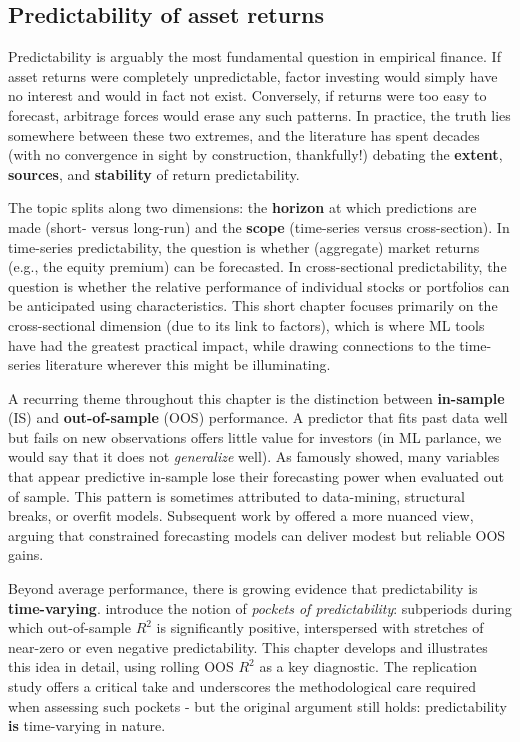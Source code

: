\subsection{Predictability of asset returns}

Predictability is arguably the most fundamental question in empirical finance. If asset returns were completely unpredictable, factor investing would simply have no interest and would in fact not exist. Conversely, if returns were too easy to forecast, arbitrage forces would erase any such patterns. In practice, the truth lies somewhere between these two extremes, and the literature has spent decades (with no convergence in sight by construction, thankfully!) debating the \textbf{extent}, \textbf{sources}, and \textbf{stability} of return predictability.

The topic splits along two dimensions: the \textbf{horizon} at which predictions are made (short- versus long-run) and the \textbf{scope} (time-series versus cross-section). In time-series predictability, the question is whether (aggregate) market returns (e.g., the equity premium) can be forecasted. In cross-sectional predictability, the question is whether the relative performance of individual stocks or portfolios can be anticipated using characteristics. This short chapter focuses primarily on the cross-sectional dimension (due to its link to factors), which is where ML tools have had the greatest practical impact, while drawing connections to the time-series literature wherever this might be illuminating.

A recurring theme throughout this chapter is the distinction between \textbf{in-sample} (IS) and \textbf{out-of-sample} (OOS) performance. A predictor that fits past data well but fails on new observations offers little value for investors (in ML parlance, we would say that it does not \textit{generalize} well). As \cite{goyal2008comprehensive} famously showed, many variables that appear predictive in-sample lose their forecasting power when evaluated out of sample. This pattern is sometimes attributed to data-mining, structural breaks, or overfit models. Subsequent work by \cite{campbell2008predicting} offered a more nuanced view, arguing that constrained forecasting models can deliver modest but reliable OOS gains.

Beyond average performance, there is growing evidence that predictability is \textbf{time-varying}. \cite{farmer2019pockets} introduce the notion of \textit{pockets of predictability}: subperiods during which out-of-sample $R^2$ is significantly positive, interspersed with stretches of near-zero or even negative predictability. This chapter develops and illustrates this idea in detail, using rolling OOS $R^2$ as a key diagnostic. The replication study \cite{cakici2025pockets} offers a critical take and underscores the methodological care required when assessing such pockets - but the original argument still holds: predictability \textbf{is} time-varying in nature.

